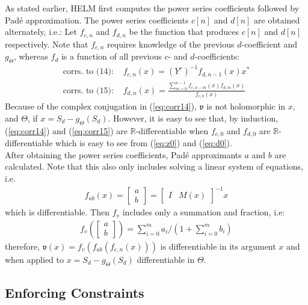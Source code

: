 As stated earlier, HELM first computes the power series coefficients followed by Pad\'e approximation. The power series coefficients $c[n]$ and $d[n]$ are obtained alternately, i.e.: Let $f_{c,n}$ and $f_{d,n}$ be the function that produces $c[n]$ and $d[n]$ respectively. Note that $f_{c,n}$ requires knowledge of the previous $d$-coefficient and $g_\Theta$, whereas $f_d$ is a function of all previous $c$- and $d$-coefficients:
\begin{align}
\text{corrs. to (14): } & f_{c,n}(x)  = (Y^r)^{-1}f_{d,n-1}(x)x^* \label{eq:corr14}\\
\text{corrs. to (15): } & f_{d,n}(x)  = \frac{\sum_{m=0}^{n-1} f_{c,n-m}(x)f_{d,m}(x)}{f_{c,0}(x)} \label{eq:corr15}
\end{align}
Because of the complex conjugation in (\ref{eq:corr14}), $\mathfrak{v}$ is not holomorphic in $x$, and $\Theta$, if $x = S_d-g_\Theta(S_d)$. However, it is easy to see that, by induction, (\ref{eq:corr14}) and (\ref{eq:corr15}) are $\mathbb{R}$-differentiable when $f_{c,0}$ and $f_{d,0}$ are $\mathbb{R}$-differentiable which is easy to see from (\ref{eq:z0}) and (\ref{eq:d0}).\\
After obtaining the power series coefficients, Pad\'e approximants $a$ and $b$ are calculated. Note that this also only includes solving a linear system of equations, i.e. \begin{align*}
f_{ab}(x) = \begin{bmatrix}a\\ b\end{bmatrix} = \begin{bmatrix}I & M(x)\end{bmatrix}^{-1}  x
\end{align*} which is differentiable. Then $f_v$ includes only a summation and fraction, i.e:
\begin{align*}
f_v(\begin{bmatrix}a\\ b\end{bmatrix}) = \sum_{i=0}^m a_i / (1+\sum_{i=0}^m b_i)
\end{align*}
therefore, $\mathfrak{v}(x) = f_v(f_{ab}(f_{c,n}(x)))$ is differentiable in its argument $x$ and when applied to $x = S_d-g_\Theta(S_d)$ differentiable in $\Theta$.

\subsection{Enforcing Constraints}
\label{sec:constraints}
